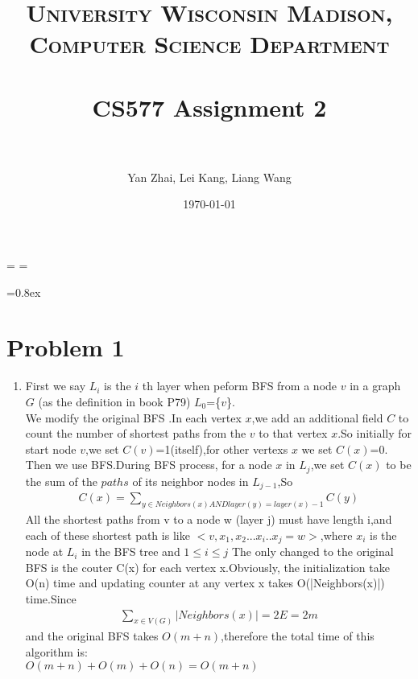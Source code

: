\documentclass[paper=a4, fontsize=11pt]{scrartcl} %
\title{	
\normalfont \normalsize 
\textsc{University Wisconsin Madison, Computer Science Department} \\ [25pt] %
\horrule{0.5pt} \\[0.4cm] %
\huge CS577 Assignment 2\\ %
\horrule{2pt} \\[0.5cm] %
}
\author{Yan Zhai, Lei Kang, Liang Wang} %
\date{\normalsize\today} %
\numberwithin{equation}{section} %
\numberwithin{figure}{section} %
\numberwithin{table}{section} %
\begin{document}
\maketitle %

\singlespacing
\newdimen\origiwspc%
\newdimen\origiwstr%
\origiwspc=\font%
\origiwstr=\font

\font=0.8ex

\section*{Problem 1}

\begin{enumerate}[label={1.\arabic*}]
  \item 
First we say  $L_{i}$ is the ${i}$ th layer when peform BFS from a node ${v}$ in a graph ${G}$ (as the definition in book P79) $L_{0}$=\{${v}$\}.\\
We modify the original BFS .In each vertex ${x}$,we add an additional field ${C}$ to count the number of shortest paths from the ${v}$ to that vertex ${x}$.So initially for start node ${v}$,we set ${C(v)}$=1(itself),for other vertexs ${x}$
we set ${C(x)}$=0.\\
Then we use BFS.During BFS process, for a node ${x}$ in $L_{j}$,we set ${C(x)}$ to be the sum of the ${paths}$ of its neighbor nodes in $L_{j-1}$,So
\begin{align*}
 C(x) = \sum_{y \in Neighbors(x)  AND  layer(y)=layer(x)-1 } C(y)
\end{align*}
All the shortest paths from v to a node w (layer j) must have length i,and each of these shortest path is like
${<v,x_1,x_2...x_i..x_j=w>}$,where ${x_i}$ is the node at ${L_i}$ in the BFS tree and ${1 \leq i \leq j}$
The only changed to the original BFS is the couter C(x) for each vertex x.Obviously, the initialization take O(n)
time and updating counter at any vertex x takes O(|Neighbors(x)|) time.Since 
\begin{align*}
\sum_{x \in V(G) } |Neighbors(x)|=2E=2m
\end{align*}
and the original BFS takes ${O(m+n)}$,therefore the total time of this algorithm is:\\
${O(m+n)+O(m)+O(n)=O(m+n)}$

\end{enumerate}
\end{document}
